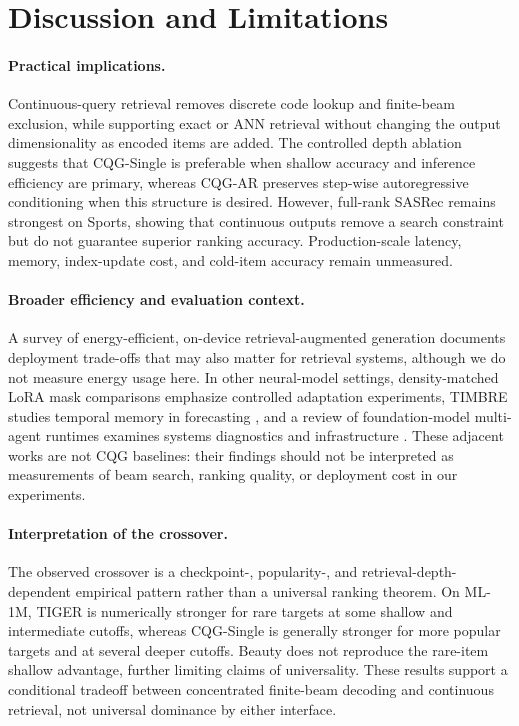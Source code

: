 \documentclass[preprint,12pt]{elsarticle}
\begin{document}
\section{Discussion and Limitations}

\paragraph{Practical implications.}
Continuous-query retrieval removes discrete code lookup and finite-beam
exclusion, while supporting exact or ANN retrieval without changing the
output dimensionality as encoded items are added. The controlled depth
ablation suggests that CQG-Single is preferable when shallow accuracy and
inference efficiency are primary, whereas CQG-AR preserves step-wise
autoregressive conditioning when this structure is desired. However,
full-rank SASRec remains strongest on Sports, showing that continuous
outputs remove a search constraint but do not guarantee superior ranking
accuracy. Production-scale latency, memory, index-update cost, and
cold-item accuracy remain unmeasured.



\paragraph{Broader efficiency and evaluation context.}
A survey of energy-efficient, on-device retrieval-augmented generation
\citep{cheng2026sustainable} documents deployment trade-offs that may also
matter for retrieval systems, although we do not measure energy usage here.
In other neural-model settings, density-matched LoRA mask comparisons
\citep{sun2026staticgradientattributionunderperforms} emphasize controlled
adaptation experiments, TIMBRE studies temporal memory in forecasting
\citep{guan2026timbreteachingtimeseries}, and a review of foundation-model
multi-agent runtimes examines systems diagnostics and infrastructure
\citep{sun2026diagnostics}. These adjacent works are not CQG baselines:
their findings should not be interpreted as measurements of beam search,
ranking quality, or deployment cost in our experiments.

\paragraph{Interpretation of the crossover.}
The observed crossover is a checkpoint-, popularity-, and
retrieval-depth-dependent empirical pattern
rather than a universal ranking theorem. On ML-1M, TIGER is numerically
stronger for rare targets at some shallow and intermediate cutoffs, whereas
CQG-Single is generally stronger for more popular targets and at several
deeper cutoffs.
Beauty does not reproduce the rare-item shallow advantage,
further limiting claims of universality. These results support a conditional
tradeoff between concentrated finite-beam decoding and continuous retrieval,
not universal dominance by either interface. 
\end{document}
